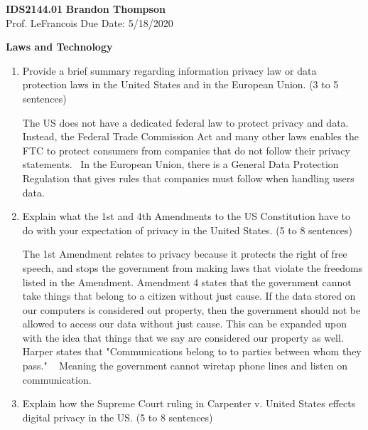 \documentclass[12pt]{article}
\begin{document}
\noindent
\textbf{IDS2144.01} \hfill \textbf{Brandon Thompson} \\
\normalsize Prof. LeFrancois \hfill Due Date: 5/18/2020 \\

\begin{center}
\textbf{Laws and Technology}
\end{center}
\begin{enumerate}
	\item Provide a brief summary regarding information privacy law or data protection laws in the United States and in the European Union. (3 to 5 sentences)

		The US does not have a dedicated federal law to protect privacy
		and data. Instead, the Federal Trade Commission Act and many other
		laws enables the FTC to protect consumers from companies that do
		not follow their privacy statements.~\cite{data_us} In the European
		Union, there
		is a General Data Protection Regulation that gives rules that
		companies must follow when handling users data.~\cite{data_eu}
		
	\item Explain what the 1st and 4th Amendments to the US Constitution have to do with your expectation of privacy in the United States. (5 to 8 sentences)

		The 1st Amendment relates to privacy because it protects the right of free speech, and stops the government from making laws that violate the freedoms listed in the Amendment. Amendment 4 states that the government cannot take things that belong to a citizen without just cause. If the data stored on our computers is considered out property, then the government should not be allowed to access our data without just cause. This can be expanded upon with the idea that things that we say are considered our property as well. Harper states that "Communications belong to to parties between whom they pass." ~\cite{harper} Meaning the government cannot wiretap phone lines and listen on communication.

	\item Explain how the Supreme Court ruling in Carpenter v. United States effects digital privacy in the US. (5 to 8 sentences)


\end{enumerate}
\end{document}
